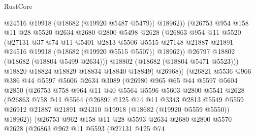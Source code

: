 \begin{lexlean}{RustCore}
\begin{coremodule}
                    @24516
                    @19918
                    (@18682 (@19920 @5487 @5479))
                    @18962))
                (@26753
                  @954
                  @158
                  @11
                  @28
                  @5520
                  @2634
                  @2680
                  @2800
                  @5498
                  @2628
                  (@26863
                    @954
                    @11
                    @5520
                    (@27131
                      @37
                      @74
                      @11
                      @5401
                      @2813
                      @5506
                      @5515
                      @27148
                      @21887
                      @21891
                      @24516
                      @19918
                      (@18682 (@19920 @5515 @5507))
                      @18962))
                  @26797
                  @18802
                  (@18682 (@18804 @5499 @2634)))
                @18802
                (@18682 (@18804 @5471 @5523)))
              @18820
              @18824
              @18829
              @18834
              @18840
              @18849)
            @26968))
        (@26821
          @5536
          @966
          @386
          @44
          @5597
          @5606
          @2634
          @3089
          (@26980
            @965
            @65
            @44
            @5597
            @5604
            @2850
            (@26753
              @758
              @964
              @11
              @40
              @5564
              @5596
              @5603
              @2800
              @5541
              @2628
              (@26863
                @758
                @11
                @5564
                (@26897
                  @125
                  @74
                  @11
                  @3343
                  @2813
                  @5549
                  @5559
                  @26912
                  @21887
                  @21891
                  @24310
                  @19918
                  (@18682 (@19920 @5559 @5550))
                  @18962))
              (@26753
                @962
                @158
                @11
                @28
                @5593
                @2634
                @2680
                @2800
                @5570
                @2628
                (@26863
                  @962
                  @11
                  @5593
                  (@27131
                    @125
                    @74

\end{coremodule}
\end{lexlean}
